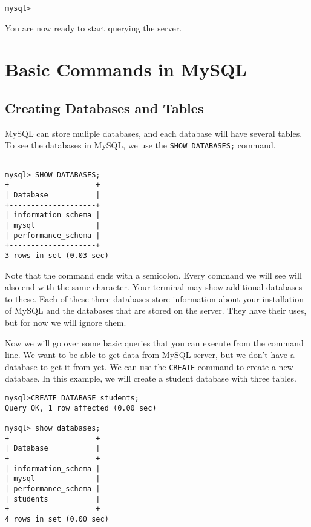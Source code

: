 {\begin{lstlisting}
mysql> 
\end{lstlisting}

You are now ready to start querying the server.

\section*{Basic Commands in MySQL}

\subsection{Creating Databases and Tables}

MySQL can store muliple databases, and each database will have several tables.  To see the databases in MySQL, we use the {\tt SHOW DATABASES;} command.

\begin{lstlisting}

mysql> SHOW DATABASES;
+--------------------+
| Database           |
+--------------------+
| information_schema |
| mysql              |
| performance_schema |
+--------------------+
3 rows in set (0.03 sec)

\end{lstlisting}

Note that the command ends with a semicolon. Every command we will see will also end with the same character.  Your terminal may show additional databases to these.  Each of these three databases store information about your installation of MySQL and the databases that are stored on the server.  They have their uses, but for now we will ignore them.

Now we will go over some basic queries that you can execute from the command line.  We want to be able to get data from MySQL server, but we don't have a database to get it from yet.  We can use the {\tt CREATE} command to create a new database.  In this example, we will create a student database with three tables.

\begin{lstlisting}
mysql>CREATE DATABASE students;
Query OK, 1 row affected (0.00 sec)

mysql> show databases;
+--------------------+
| Database           |
+--------------------+
| information_schema |
| mysql              |
| performance_schema |
| students           |
+--------------------+
4 rows in set (0.00 sec)

\end{lstlisting}

}
